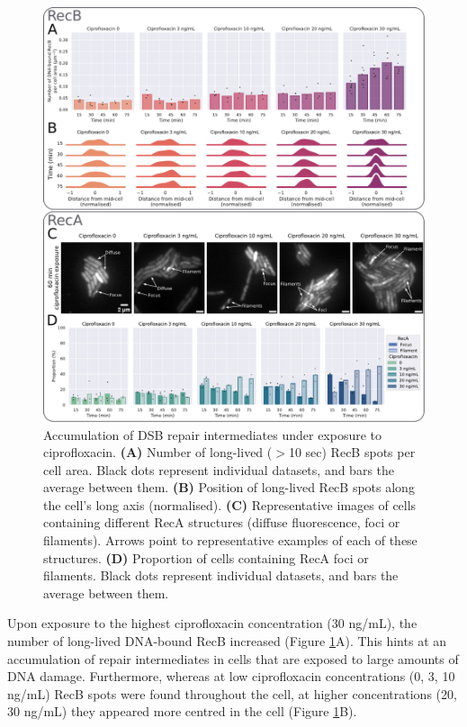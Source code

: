 \begin{figure}[htbp]
    \centering
    \includegraphics[width=.8\textwidth]{Figures/Fig4_cipro_30ngmL.pdf}
    \caption{Accumulation of DSB repair intermediates under exposure to ciprofloxacin. \textbf{(A)} Number of long-lived ($>$10 sec) RecB spots per cell area. Black dots represent individual datasets, and bars the average between them. \textbf{(B)} Position of long-lived RecB spots along the cell's long axis (normalised). \textbf{(C)} Representative images of cells containing different RecA structures (diffuse fluorescence, foci or filaments). Arrows point to representative examples of each of these structures. \textbf{(D)} Proportion of cells containing RecA foci or filaments. Black dots represent individual datasets, and bars the average between them.}
    \label{Fig:high_cipro}
\end{figure}

Upon exposure to the highest cipro\-floxacin concentration (30 ng/mL), the number of long-lived DNA-bound RecB increased (Figure \ref{Fig:high_cipro}A). This hints at an accumulation of repair intermediates in cells that are exposed to large amounts of DNA damage. Furthermore, whereas at low ciprofloxacin concentrations (0, 3, 10 ng/mL) RecB spots were found throughout the cell, at higher concentrations (20, 30 ng/mL) they appeared more centred in the cell (Figure \ref{Fig:high_cipro}B).

